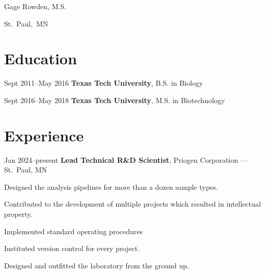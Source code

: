\documentclass{resume}
\begin{document}
    
    \newsavebox\ANDbox
    \sbox\ANDbox{$|$}

    \begin{header}
        \fontsize{25 pt}{25 pt}\selectfont Gage Rowden, M.S.

        \vspace{5 pt}

        \normalsize
        \mbox{St. Paul, MN}%
        \AND%
        \mbox{}%
        \AND%
        \mbox{}%
        \AND%
        \mbox{}%
        \AND%
        \mbox{}%
    \end{header}

    \vspace{5 pt - 0.3 cm}

    \section{Education}
        \begin{twocolentry}{
            Sept 2011--May 2016
        }
            \textbf{Texas Tech University}, B.S. in Biology
        \end{twocolentry}

        \begin{twocolentry}{
            Sept 2016--May 2018
        }
            \textbf{Texas Tech University}, M.S. in Biotechnology
        \end{twocolentry}

    \section{Experience}
        \begin{twocolentry}{Jan 2024--present}
            \textbf{Lead Technical R\&D Scientist}, Priogen Corporation --- St.\ Paul, MN
        \end{twocolentry}
        \vspace{0.10 cm}
        \begin{onecolentry}
            \begin{highlights}
                \item Designed the analysis pipelines for more than a dozen sample types.
                \item Contributed to the development of multiple projects which resulted in intellectual property.
                \item Implemented standard operating procedures
                \item Instituted version control for every project.
                \item Designed and outfitted the laboratory from the ground up.
            \end{highlights}
        \end{onecolentry}
        \vspace{0.2 cm}
\end{document}
